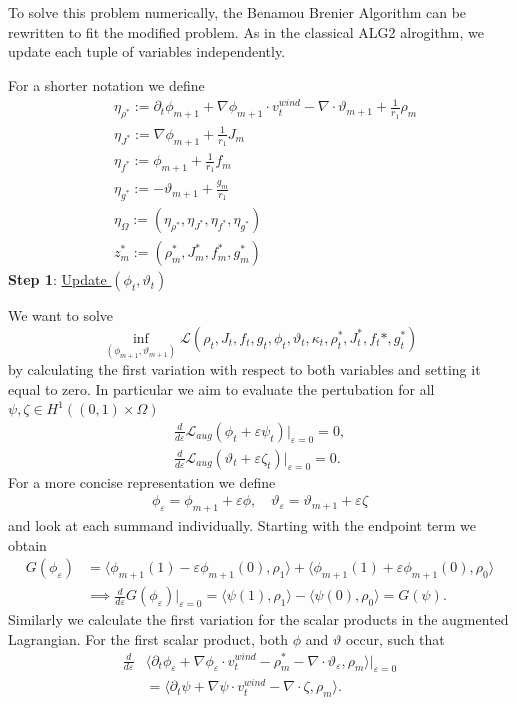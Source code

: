 To solve this problem numerically, the Benamou Brenier Algorithm can be rewritten to fit the modified problem. As in the classical ALG2 alrogithm, we update each tuple of variables independently. 

For a shorter notation we define
\begin{align*}
	&\eta_{\rho^*} :=\partial_t\phi_{m+1} + \nabla\phi_{m+1} \cdot v_t^{wind} - \nabla \cdot \vartheta_{m+1}+ \frac{1}{r_1}\rho_m\\
	&\eta_{J^*} := \nabla\phi_{m+1} + \frac{1}{r_1}J_m\\
	&\eta_{f^*} := \phi_{m+1} + \frac{1}{r_1}f_m\\
	&\eta_{g^*} := -\vartheta_{m+1} + \frac{g_{m}}{r_1}\\
	&\eta_\Omega := (\eta_{\rho^*},\eta_{J^*}, \eta_{f^*}, \eta_{g^*})\\
	&z_m^* := (\rho_{m}^*, J_m^*, f_m^*, g_m^*)
\end{align*}
\textbf{Step 1}: \underline{Update $(\phi_t, \vartheta_t)$}

We want to solve 
$$
\inf_{(\phi_{m+1},\vartheta_{m+1})} \mathcal{L}(\rho_t, J_t, f_t, g_t,\phi_t,\vartheta_t, \kappa_t, \rho_t^*, J_t^*, f_t*,g_t^*)
$$
by calculating the first variation with respect to both variables and setting it equal to zero. In particular we aim to evaluate the pertubation for all $\psi, \zeta \in H^1((0,1)\times\Omega)$ %
\begin{align*}
\frac{d}{d\varepsilon}\mathcal{L}_{aug}(\phi_t + \varepsilon\psi_t)\Big\lvert_{\varepsilon = 0} = 0,\\
	\frac{d}{d\varepsilon}\mathcal{L}_{aug}(\vartheta_t + \varepsilon\zeta_t)\Big\lvert_{\varepsilon = 0} = 0.
\end{align*}
For a more concise representation we define
\begin{align*}
\phi_\varepsilon = \phi_{m+1} + \varepsilon\phi,\quad\vartheta_\varepsilon = \vartheta_{m+1} + \varepsilon\zeta
\end{align*}
and look at each summand individually. Starting with the endpoint term we obtain
\begin{align*}
	G(\phi_\varepsilon) &= \langle \phi_{m+1}(1) - \varepsilon\phi_{m+1}(0),\rho_1\rangle + \langle \phi_{m+1}(1) + \varepsilon\phi_{m+1}(0),\rho_0\rangle\\
						 &\implies\frac{d}{d\varepsilon} G(\phi_\varepsilon) \Big\lvert_{\varepsilon = 0} = \langle \psi(1),\rho_1\rangle - \langle \psi(0),\rho_0\rangle = G(\psi).
\end{align*}
Similarly we calculate the first variation for the scalar products in the augmented Lagrangian. For the first scalar product, both $\phi$ and $\vartheta$ occur, such that 
\begin{align*}
	\frac{d}{d\varepsilon}&\langle\partial_t\phi_\varepsilon + \nabla\phi_\varepsilon\cdot v_t^{wind}-\rho_m^*-\nabla \cdot \vartheta_\varepsilon,\rho_m\rangle \Big\lvert_{\varepsilon = 0}\\
						  &=\langle\partial_t\psi + \nabla\psi \cdot v_t^{wind} - \nabla \cdot \zeta,\rho_m\rangle.
\end{align*}

